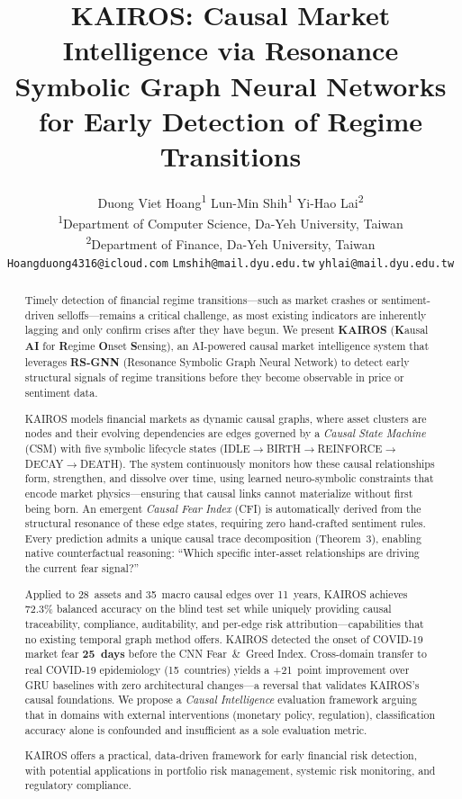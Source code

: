 \documentclass[11pt]{article}
\title{KAIROS: Causal Market Intelligence via Resonance Symbolic Graph Neural Networks for Early Detection of Regime Transitions}
\author{
  Duong Viet Hoang\textsuperscript{1} \quad Lun-Min Shih\textsuperscript{1} \quad Yi-Hao Lai\textsuperscript{2} \\[0.3em]
  \textsuperscript{1}Department of Computer Science, Da-Yeh University, Taiwan \\
  \textsuperscript{2}Department of Finance, Da-Yeh University, Taiwan \\[0.2em]
  \texttt{Hoangduong4316@icloud.com} \quad \texttt{Lmshih@mail.dyu.edu.tw} \quad \texttt{yhlai@mail.dyu.edu.tw}
}
\date{}
\begin{document}
\maketitle

\begin{abstract}
Timely detection of financial regime transitions---such as market crashes or sentiment-driven selloffs---remains a critical challenge, as most existing indicators are inherently lagging and only confirm crises after they have begun. We present \textbf{KAIROS} (\textbf{K}ausal \textbf{AI} for \textbf{R}egime \textbf{O}nset \textbf{S}ensing), an AI-powered causal market intelligence system that leverages \textbf{RS-GNN} (Resonance Symbolic Graph Neural Network) to detect early structural signals of regime transitions before they become observable in price or sentiment data.

KAIROS models financial markets as dynamic causal graphs, where asset clusters are nodes and their evolving dependencies are edges governed by a \emph{Causal State Machine} (CSM) with five symbolic lifecycle states (IDLE$\to$BIRTH$\to$REINFORCE$\to$DECAY$\to$DEATH). The system continuously monitors how these causal relationships form, strengthen, and dissolve over time, using learned neuro-symbolic constraints that encode market physics---ensuring that causal links cannot materialize without first being born. An emergent \emph{Causal Fear Index} (CFI) is automatically derived from the structural resonance of these edge states, requiring zero hand-crafted sentiment rules. Every prediction admits a unique causal trace decomposition (Theorem~3), enabling native counterfactual reasoning: ``Which specific inter-asset relationships are driving the current fear signal?''

Applied to 28~assets and 35~macro causal edges over 11~years, KAIROS achieves 72.3\% balanced accuracy on the blind test set while uniquely providing causal traceability, compliance, auditability, and per-edge risk attribution---capabilities that no existing temporal graph method offers. KAIROS detected the onset of COVID-19 market fear \textbf{25~days} before the CNN Fear~\&~Greed Index. Cross-domain transfer to real COVID-19 epidemiology (15~countries) yields a +21~point improvement over GRU baselines with zero architectural changes---a reversal that validates KAIROS's causal foundations. We propose a \emph{Causal Intelligence} evaluation framework arguing that in domains with external interventions (monetary policy, regulation), classification accuracy alone is confounded and insufficient as a sole evaluation metric.

KAIROS offers a practical, data-driven framework for early financial risk detection, with potential applications in portfolio risk management, systemic risk monitoring, and regulatory compliance.
\end{abstract}
\end{document}
